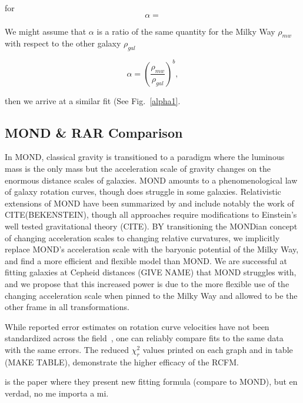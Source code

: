 \documentclass[reprint,%
 amsmath,amssymb,
 aps,
]{revtex4-1}
\begin{document}
for 
\begin{equation}
    \alpha = 
\end{equation}



We might assume that $\alpha$ is a ratio of the same quantity for  the Milky Way $\rho_{mw}$ with respect to the other   galaxy $\rho_{gal}$  

\begin{equation}
\alpha=\left(\frac{\rho_{mw}}{\rho_{gal}}\right)^{b}  ,
\label{correl}
\end{equation}

then we arrive at a similar fit (See Fig.~\ref{alpha1}.

 
\subsection{MOND  \& RAR Comparison}



 
 In MOND,  classical gravity is transitioned to  a paradigm where the luminous mass is the only mass  but    the acceleration scale of gravity changes on the enormous distance scales of galaxies. MOND amounts to a phenomenological law of galaxy rotation curves, though does struggle in some galaxies.  Relativistic extensions of MOND have been summarized by  \citet{Famaey2012} and include notably the work of CITE(BEKENSTEIN), though all approaches require modifications to Einstein's well tested gravitational theory (CITE). 
  BY transitioning the MONDian concept of changing acceleration scales to changing  relative curvatures, we implicitly replace MOND's acceleration scale with the baryonic potential of the Milky Way, and find a more 
  efficient and flexible model than MOND. We are successful at fitting galaxies at Cepheid distances (GIVE NAME) that MOND struggles with, and we propose that this increased power is due to the more flexible use of the changing acceleration scale when pinned to the Milky Way and allowed to be the other frame in all transformations. 
  
While reported error    estimates on rotation curve velocities  have not been standardized across the field~\citep{Blok,Gent},     one can reliably   compare fits to the same data with the same  errors. The     reduced $\chi^2_r$ values printed on each graph and in table (MAKE TABLE), demonstrate the higher efficacy of the RCFM. 
 
  \citet{McGaugh2016RAR} is the paper where they present new fitting formula (compare to MOND), but en verdad, no me importa a mi. 
  
\end{document}
